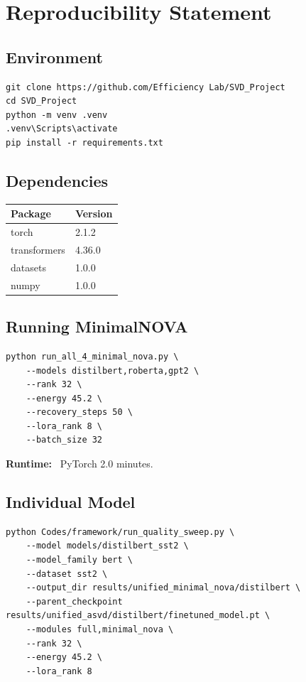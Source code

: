 
\section{Reproducibility Statement}

\subsection{Environment}

\begin{lstlisting}
git clone https://github.com/Efficiency Lab/SVD_Project
cd SVD_Project
python -m venv .venv
.venv\Scripts\activate
pip install -r requirements.txt
\end{lstlisting}

\subsection{Dependencies}

\begin{table}[H]
\centering
\small
\begin{tabular}{ll}
\toprule
\textbf{Package} & \textbf{Version} \\
\midrule
torch & 2.1.2 \\
transformers & 4.36.0 \\
datasets & 1.0.0 \\
numpy & 1.0.0 \\
\bottomrule
\end{tabular}
\end{table}

\subsection{Running MinimalNOVA}

\begin{lstlisting}
python run_all_4_minimal_nova.py \
    --models distilbert,roberta,gpt2 \
    --rank 32 \
    --energy 45.2 \
    --recovery_steps 50 \
    --lora_rank 8 \
    --batch_size 32
\end{lstlisting}

\textbf{Runtime:} ~PyTorch 2.0 minutes.

\subsection{Individual Model}

\begin{lstlisting}
python Codes/framework/run_quality_sweep.py \
    --model models/distilbert_sst2 \
    --model_family bert \
    --dataset sst2 \
    --output_dir results/unified_minimal_nova/distilbert \
    --parent_checkpoint results/unified_asvd/distilbert/finetuned_model.pt \
    --modules full,minimal_nova \
    --rank 32 \
    --energy 45.2 \
    --lora_rank 8
\end{lstlisting}

